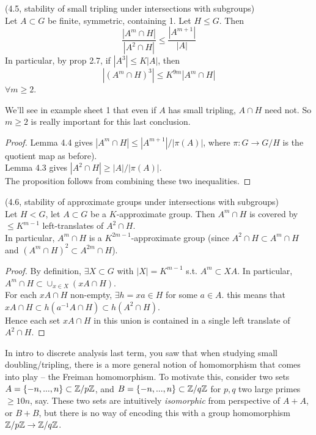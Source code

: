 \documentclass[a4paper]{article}
\begin{document}
\begin{prop} (4.5, stability of small tripling under intersections with subgroups)\\
Let $A \subset G$ be finite, symmetric, containing 1. Let $H \leq G$. Then
\[
\frac{|A^m \cap H|}{|A^2 \cap H|} \leq \frac{|A^{m+1}|}{|A|}
\]
In particular, by prop 2.7, if $|A^3| \leq K|A|$, then 
\[
|(A^m \cap H)^3| \leq K^{9m} |A^m \cap H|
\]
$\forall m \geq 2$.
\begin{rem}
We'll see in example sheet 1 that even if $A$ has small tripling, $A \cap H$ need not. So $m \geq 2$ is really important for this last conclusion.
\end{rem}
\begin{proof}
Lemma 4.4 gives $|A^m \cap H| \leq |A^{m+1}| / |\pi(A)|$, where $\pi:G \to G/H$ is the quotient map as before).\\
Lemma 4.3 gives $|A^2 \cap H| \geq |A| / |\pi(A)|$.\\
The proposition follows from combining these two inequalities.
\end{proof}
\end{prop}

\begin{prop} (4.6, stability of approximate groups under intersections with subgroups)\\
Let $H < G$, let $A \subset G$ be a $K$-approximate group. Then $A^m \cap H$ is covered by $\leq K^{m-1}$ left-translates of $A^2 \cap H$.\\
In particular, $A^m \cap H$ is a $K^{2m-1}$-approximate group (since $A^2 \cap H \subset A^m \cap H$ and $(A^m \cap H)^2 \subset A^{2m} \cap H$).
\begin{proof}
By definition, $\exists X \subset G$ with $|X| = K^{m-1}$ s.t. $A^m \subset XA$. In particular, $A^m \cap H \subset \cup_{x \in X} (xA \cap H)$.\\
For each $xA \cap H$ non-empty, $\exists h = xa \in H$ for some $a \in A$. this means that $xA \cap H \subset h(a^{-1} A \cap H) \subset h(A^2 \cap H)$.\\
Hence each set $xA \cap H$ in this union is contained in a single left translate of $A^2 \cap H$.
\end{proof}
\end{prop}

In intro to discrete analysis last term, you saw that when studying small doubling/tripling, there is a more general notion of homomorphism that comes into play -- the Freiman homomorphism. To motivate this, consider two sets $A=\{-n,...,n\} \subset \mathbb{Z}/p\mathbb{Z}$, and $B = \{-n,...,n\} \subset \mathbb{Z}/q\mathbb{Z}$ for $p,q$ two large primes $\geq 10n$, say. These two sets are intuitively \emph{isomorphic} from perspective of $A+A$, or $B+B$, but there is no way of encoding this with a group homomorphism $\mathbb{Z}/p\mathbb{Z} \to \mathbb{Z}/q\mathbb{Z}$.
\end{document}
